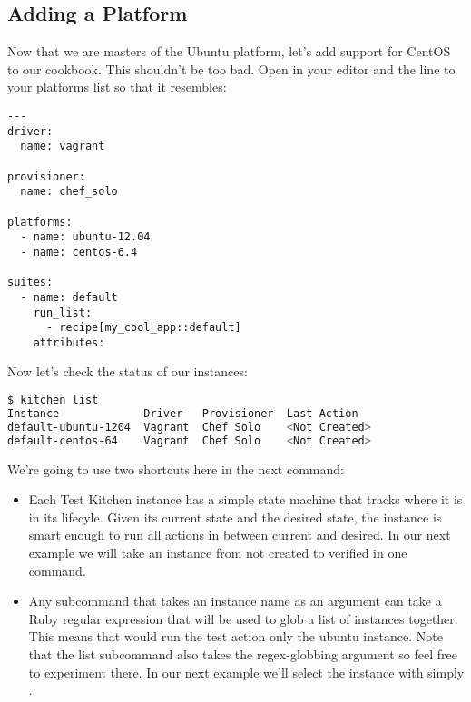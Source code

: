 \subsection{Adding a Platform}

Now that we are masters of the Ubuntu platform, let's add support for CentOS to our cookbook. This shouldn't be too bad. Open  in your editor and the  line to your platforms list so that it resembles:

\begin{lstlisting}[label=lst:testing-test-kitchen20]
---
driver:
  name: vagrant

provisioner:
  name: chef_solo

platforms:
  - name: ubuntu-12.04
  - name: centos-6.4

suites:
  - name: default
    run_list:
      - recipe[my_cool_app::default]
    attributes:
\end{lstlisting}

Now let's check the status of our instances:

\begin{lstlisting}[language=Bash,label=lst:testing-test-kitchen21]
$ kitchen list
Instance             Driver   Provisioner  Last Action
default-ubuntu-1204  Vagrant  Chef Solo    <Not Created>
default-centos-64    Vagrant  Chef Solo    <Not Created>
\end{lstlisting}

We're going to use two shortcuts here in the next command:

\begin{itemize}
  \item Each Test Kitchen instance has a simple state machine that tracks where it is in its lifecyle. Given its current state and the desired state, the instance is smart enough to run all actions in between current and desired. In our next example we will take an instance from not created to verified in one command.
  \item Any  subcommand that takes an instance name as an argument can take a Ruby regular expression that will be used to glob a list of instances together. This means that  would run the test action only the ubuntu instance. Note that the list subcommand also takes the regex-globbing argument so feel free to experiment there. In our next example we'll select the  instance with simply .
\end{itemize}

